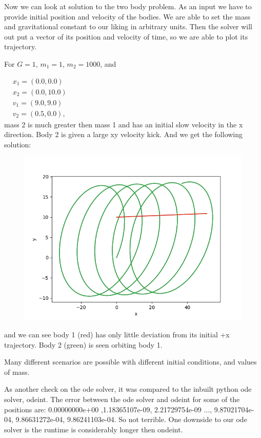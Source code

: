 \documentclass[12pt]{article}
\begin{document}
Now we can look at solution to the two body problem. As an input we have to provide initial position and velocity of the bodies. We are able to set the mass and gravitational constant to our liking in arbitrary units. Then the solver will out put a vector of its position and velocity of time, so we are able to plot its trajectory. 

For $G=1$, $m_1 = 1$, $m_2 = 1000$, and 

$
\begin{array}{ll}
& x_1 = (0.0, 0.0)\\
& x_2 = (0.0, 10.0)\\
& v_1 = (9.0, 9.0)\\
& v_2 = (0.5, 0.0),
\end{array}
$
\\
mass 2 is much greater then mass 1 and has an initial slow velocity in the x direction. Body 2 is given a large xy velocity kick. And we get the following solution:

\begin{figure}[h!]
    \centering
    \includegraphics[scale=0.6]{1.png}
    \label{fig:1}
\end{figure}
and we can see body 1 (red) has only little deviation from its initial +x trajectory. Body 2 (green) is seen orbiting body 1.

Many different scenarios are possible with different initial conditions, and values of mass.

As another check on the ode solver, it was compared to the inbuilt python ode solver, odeint. The error between the ode solver and odeint for some of the positions are: 0.00000000e+00 ,1.18365107e-09,   2.21729754e-09 ..., 9.87021704e-04, 9.86631272e-04, 9.86241103e-04. So not terrible. One downside to our ode solver is the runtime is considerably longer then ondeint. 
\end{document}
